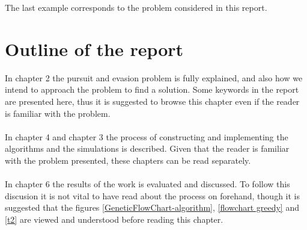 The last example corresponds to the problem considered in this report.
\section{Outline of the report}
In chapter 2 the pursuit and evasion problem is fully explained, and also how we intend to approach the problem to find a solution. Some keywords in the report are presented here, thus it is suggested to browse this chapter even if the reader is familiar with the problem.\\
\\In chapter 4 and chapter 3 the process of constructing and implementing the algorithms and the simulations is described. Given that the reader is familiar with the problem presented, these chapters can be read separately.\\
\\In chapter 6 the results of the work is evaluated and discussed. To follow this discusion it is not vital to have read about the process on forehand, though it is suggested that the figures \ref{GeneticFlowChart-algorithm}, \ref{flowchart greedy} and \ref{t2} are viewed and understood before reading this chapter.



